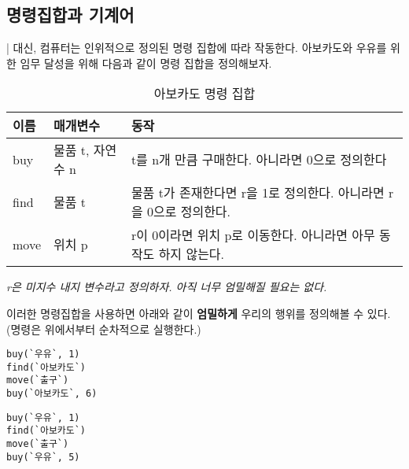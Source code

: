 \documentclass{article}
\begin{document}
\pagebreak

\subsection{명령집합과 기계어}

| 대신, 컴퓨터는 인위적으로 정의된 명령 집합에 따라 작동한다. 아보카도와
우유를 위한 임무 달성을 위해 다음과 같이 명령 집합을 정의해보자.

\begin{table}[!h]
\begin{center}
    \caption{아보카도 명령 집합}
    \begin{tabular}{ || m{2em} | m{3.8em} | m{22em} || }
        \hline
        이름 & 매개변수 & 동작 \\
        \hline\hline
        buy & 물품 t, 자연수 n & t를 n개 만큼 구매한다. 아니라면 0으로 정의한다 \\
        \hline
        find & 물품 t & 물품 t가 존재한다면 r을 1로 정의한다. 아니라면 r을 0으로 정의한다. \\
        \hline
        move & 위치 p & r이 0이라면 위치 p로 이동한다. 아니라면 아무 동작도 하지 않는다. \\
        \hline
    \end{tabular}
    \newline
    \textit{\color{gray} \small r은 미지수 내지 변수라고 정의하자.
    아직 너무 엄밀해질 필요는 없다.}
\end{center}
\end{table}

이러한 명령집합을 사용하면 아래와 같이 \textbf{엄밀하게} 우리의 행위를
정의해볼 수 있다. (명령은 위에서부터 순차적으로 실행한다.)

\begin{minipage}{0.45\textwidth}
    \begin{lstlisting}[escapeinside=``]
buy(`우유`, 1)
find(`아보카도`)
move(`출구`)
buy(`아보카도`, 6)
    \end{lstlisting}
\end{minipage}
\hfill
\begin{minipage}{0.45\textwidth}
    \begin{lstlisting}[escapeinside=``]
buy(`우유`, 1)
find(`아보카도`)
move(`출구`)
buy(`우유`, 5)
    \end{lstlisting}
\end{minipage}
\end{document}
